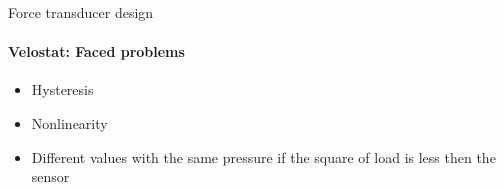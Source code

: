 \documentclass[aspectratio=169]{beamer}
\begin{document}
\begin{frame}[t]{Force transducer design}
    \framesubtitle{Velostat: Faced problems}
    \vspace{-20pt}
    \begin{multicols}{2}
        {\Large
            \begin{itemize}
                \item Hysteresis
                \item Nonlinearity
                \item Different values with the same pressure if the square of load is less then the sensor
            \end{itemize}}
            \begin{figure}[H]
                \centering
\end{figure}
\end{multicols}
\end{frame}
\end{document}
